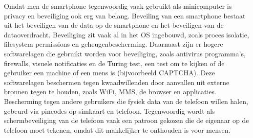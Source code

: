 Omdat men de smartphone tegenwoordig vaak gebruikt als minicomputer is privacy en beveiliging ook erg van belang. Beveiling van een smartphone bestaat uit het beveiligen van de data op de smartphone en het beveiligen van de dataoverdracht. Beveiliging zit vaak al in het OS ingebouwd, zoals proces isolatie, filesystem permissions en geheugenbescherming. Daarnaast zijn er hogere softwarelagen die gebruikt worden voor beveiliging, zoals antivirus programma's, firewalls, visuele notificaties en de Turing test, een test om te kijken of de gebruiker een machine of een mens is (bijvoorbeeld CAPTCHA). Deze softwarelagen beschermen tegen kwaadwillenden door aanvallen uit externe bronnen tegen te houden, zoals WiFi, MMS, de browser en applicaties. Bescherming tegen andere gebruikers die fysiek data van de telefoon willen halen, gebeurd via pincodes op simkaart en telefoon. Tegenwoordig wordt als schermbeveiliging van de telefoon vaak een patroon gekozen die de eigenaar op de telefoon moet tekenen, omdat dit makkelijker te onthouden is voor mensen.
